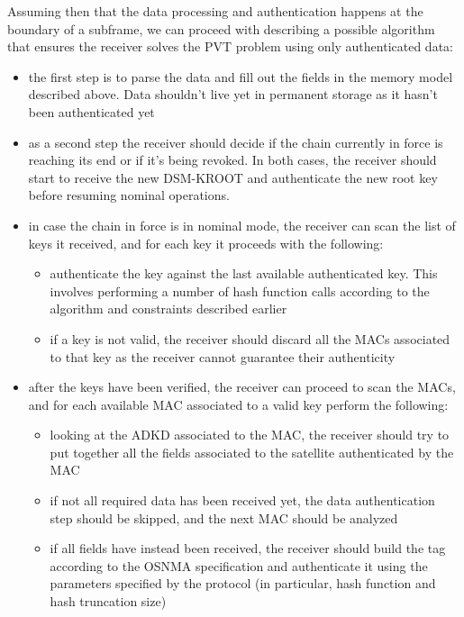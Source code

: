 Assuming then that the data processing and authentication happens at the
boundary of a subframe, we can proceed with describing a possible algorithm that
ensures the receiver solves the PVT problem using only authenticated data:
\begin{itemize}
  \item the first step is to parse the data and fill out the fields in the
    memory model described above. Data shouldn't live yet in permanent storage
    as it hasn't been authenticated yet
  \item as a second step the receiver should decide if the chain currently in
    force is reaching its end or if it's being revoked. In both cases, the
    receiver should start to receive the new DSM-KROOT and authenticate the new
    root key before resuming nominal operations.
  \item in case the chain in force is in nominal mode, the receiver can scan the
    list of keys it received, and for each key it proceeds with the following:
    \begin{itemize}
      \item authenticate the key against the last available authenticated key.
        This involves performing a number of hash function calls according to
        the algorithm and constraints described earlier
      \item if a key is not valid, the receiver should discard all the MACs
        associated to that key as the receiver cannot guarantee their
        authenticity
    \end{itemize}
  \item after the keys have been verified, the receiver can proceed to scan the
    MACs, and for each available MAC associated to a valid key perform the
    following:
    \begin{itemize}
      \item looking at the ADKD associated to the MAC, the receiver should try
        to put together all the fields associated to the satellite authenticated
        by the MAC
      \item if not all required data has been received yet, the data
        authentication step should be skipped, and the next MAC should be
        analyzed
      \item if all fields have instead been received, the receiver should build
        the tag according to the OSNMA specification and authenticate it using
        the parameters specified by the protocol (in particular, hash function
        and hash truncation size)

\end{itemize}
\end{itemize}
